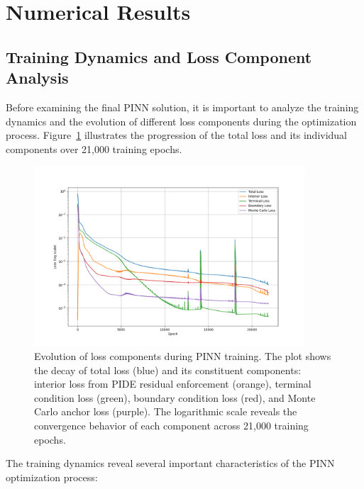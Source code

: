 \documentclass[11pt,twoside,openright]{report}
\begin{document}
\section{Numerical Results}

\subsection{Training Dynamics and Loss Component Analysis}
\label{sec:training_dynamics}

Before examining the final PINN solution, it is important to analyze the training dynamics and the evolution of different loss components during the optimization process. Figure~\ref{fig:loss_components} illustrates the progression of the total loss and its individual components over 21,000 training epochs.

\begin{figure}[htbp]
    \centering
    \includegraphics[width=0.9\textwidth]{Figures/loss_components.png}
    \caption{Evolution of loss components during PINN training. The plot shows the decay of total loss (blue) and its constituent components: interior loss from PIDE residual enforcement (orange), terminal condition loss (green), boundary condition loss (red), and Monte Carlo anchor loss (purple). The logarithmic scale reveals the convergence behavior of each component across 21,000 training epochs.}
    \label{fig:loss_components}
\end{figure}

The training dynamics reveal several important characteristics of the PINN optimization process:
\end{document}
